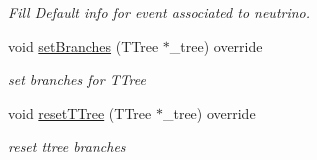 \begin{DoxyCompactItemize}
\begin{DoxyCompactList}\small\item\em Fill Default info for event associated to neutrino. \end{DoxyCompactList}\item 
void \hyperlink{classanalysis_1_1ShowerAnalysis_a007102f8d6c1f72551124b35b846662d}{set\+Branches} (T\+Tree $\ast$\+\_\+tree) override\hypertarget{classanalysis_1_1ShowerAnalysis_a007102f8d6c1f72551124b35b846662d}{}\label{classanalysis_1_1ShowerAnalysis_a007102f8d6c1f72551124b35b846662d}

\begin{DoxyCompactList}\small\item\em set branches for T\+Tree \end{DoxyCompactList}\item 
void \hyperlink{classanalysis_1_1ShowerAnalysis_ada860a9b6f8b905dbac09634138aa340}{reset\+T\+Tree} (T\+Tree $\ast$\+\_\+tree) override\hypertarget{classanalysis_1_1ShowerAnalysis_ada860a9b6f8b905dbac09634138aa340}{}\label{classanalysis_1_1ShowerAnalysis_ada860a9b6f8b905dbac09634138aa340}

\begin{DoxyCompactList}\small\item\em reset ttree branches \end{DoxyCompactList}\end{DoxyCompactItemize}
